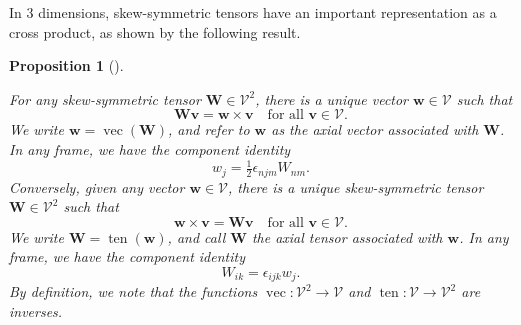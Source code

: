 \documentclass[
  letterpaper,
  DIV=11,
  numbers=noendperiod]{scrreprt}
\theoremstyle{plain}
\newtheorem{proposition}{Proposition}[chapter]
\theoremstyle{remark}
\begin{document}
In 3 dimensions, skew-symmetric tensors have an important representation
as a cross product, as shown by the following result.

\begin{proposition}[]\protect\hypertarget{prp-skewtensorvectorproduct}{}\label{prp-skewtensorvectorproduct}

For any skew-symmetric tensor \({\boldsymbol{W}}\in{\mathcal{V}}^2\),
there is a unique vector \({\boldsymbol{w}}\in{\mathcal{V}}\) such that
\[{\boldsymbol{W}}{\boldsymbol{v}}= {\boldsymbol{w}}\times{\boldsymbol{v}}\quad\text{for all }{\boldsymbol{v}}\in{\mathcal{V}}.\]
We write \({\boldsymbol{w}}= {\operatorname{vec}}({\boldsymbol{W}})\),
and refer to \({\boldsymbol{w}}\) as the \emph{axial vector} associated
with \({\boldsymbol{W}}\). In any frame, we have the component identity
\[w_j = \tfrac12\epsilon_{njm}W_{nm}.\] Conversely, given any vector
\({\boldsymbol{w}}\in{\mathcal{V}}\), there is a unique skew-symmetric
tensor \({\boldsymbol{W}}\in{\mathcal{V}}^2\) such that
\[{\boldsymbol{w}}\times{\boldsymbol{v}}= {\boldsymbol{W}}{\boldsymbol{v}}\quad\text{for all }{\boldsymbol{v}}\in{\mathcal{V}}.\]
We write \({\boldsymbol{W}}= {\operatorname{ten}}({\boldsymbol{w}})\),
and call \({\boldsymbol{W}}\) the \emph{axial tensor} associated with
\({\boldsymbol{w}}\). In any frame, we have the component identity
\[W_{ik} = \epsilon_{ijk}w_j.\] By definition, we note that the
functions \({\operatorname{vec}}:{\mathcal{V}}^2\to{\mathcal{V}}\) and
\({\operatorname{ten}}:{\mathcal{V}}\to{\mathcal{V}}^2\) are inverses.

\end{proposition}
\end{document}
